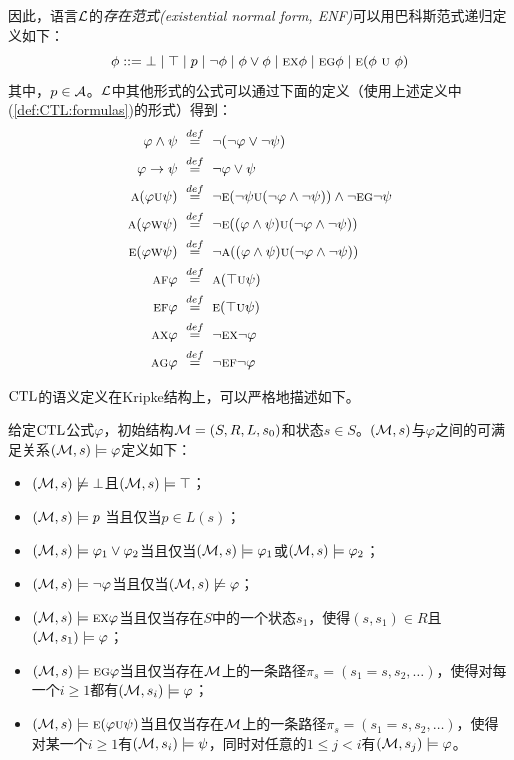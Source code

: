 因此，语言$\cal L$的\emph{存在范式(existential normal form, ENF)}可以用巴科斯范式递归定义如下：
\begin{equation}\label{def:CTL:formulas}
	\phi ::=  \bot \mid \top \mid p \mid\neg\phi \mid \phi\lor\phi \mid
	\textsc{e} \textsc{x} \phi \mid
	\textsc{e} \textsc{g} \phi \mid
	\textsc{e} (\phi\ \textsc{u}\ \phi)
\end{equation}
其中，$p\in {\cal A}$。$\cal L$中其他形式的公式可以通过下面的定义（使用上述定义中(\ref{def:CTL:formulas})的形式）得到：
\begin{alignat}{2}
	 \varphi \wedge \psi& \ \overset{def}{=}\ \neg (\neg \varphi \vee \neg \psi)\\
	 \varphi \rto \psi& \ \overset{def}{=}\ \neg \varphi \vee \psi\\
	 \ALL(\varphi \UNTILL \psi)& \ \overset{def}{=}\ \neg\EXIST(\neg \psi \UNTILL(\neg \varphi \wedge \neg \psi)) \wedge \neg \EXIST \GLOBAL \neg \psi\\
	 \ALL(\varphi \UNLESS \psi)& \ \overset{def}{=}\  \neg\EXIST((\varphi \wedge \psi) \UNTILL (\neg \varphi \wedge \neg \psi))\\
	 \EXIST(\varphi \UNLESS \psi)& \ \overset{def}{=}\  \neg\ALL((\varphi \wedge \psi) \UNTILL (\neg \varphi \wedge \neg \psi))\\
	 \ALL\FUTURE \varphi& \ \overset{def}{=}\ 	\ALL(\top \UNTILL \psi)\\
	 \EXIST\FUTURE \varphi& \ \overset{def}{=}\ \EXIST(\top \UNTILL \psi)\\
	 \ALL \NEXT \varphi& \ \overset{def}{=}\  \neg \EXIST \NEXT \neg \varphi\\
	 \ALL \GLOBAL \varphi& \ \overset{def}{=}\  \neg \EXIST \FUTURE \neg \varphi
\end{alignat}

$\textrm{CTL}$的语义定义在Kripke结构上，可以严格地描述如下。
\begin{definition}\label{def:ctl:semantic}
	给定$\textrm{CTL}$公式$\varphi$，初始结构${\cal M}=(S,R,L,s_0)$和状态$s\in S$。$({\cal M},s)$与$\varphi$之间的可满足关系$({\cal M},s)\models \varphi$定义如下：
	\begin{itemize}
		\item $({\cal M},s) \not \models \bot$且$({\cal M}, s) \models \top$；
		\item $({\cal M},s)\models p$ 当且仅当$p\in L(s)$；
		\item $({\cal M},s) \models \varphi_1 \vee \varphi_2$当且仅当$({\cal M},s)\models \varphi_1$或$({\cal M},s)\models \varphi_2$；
		\item $({\cal M},s)\models \neg \varphi$当且仅当$({\cal M},s)\not \models \varphi$；
		\item $({\cal M},s)\models \textsc{e}\textsc{x} \varphi$当且仅当存在$S$中的一个状态$s_1$，使得$(s,s_1)\in R$且$({\cal M},s_1)\models \varphi$；
		\item $({\cal M},s)\models \textsc{e}\textsc{g}\varphi$当且仅当存在${\cal M}$上的一条路径$\pi_s=(s_1=s, s_2,\dots)$，使得对每一个$i\ge 1$都有$({\cal M},s_i)\models \varphi$；
		\item $({\cal M},s)\models \textsc{e}(\varphi \textsc{u} \psi)$当且仅当存在${\cal M}$上的一条路径$\pi_s=(s_1=s, s_2,\dots)$，使得对某一个$i\ge 1$有$({\cal M},s_i)\models \psi$，同时对任意的$1\leq j < i$有$({\cal M},s_j)\models \varphi$。
	\end{itemize}
\end{definition}

